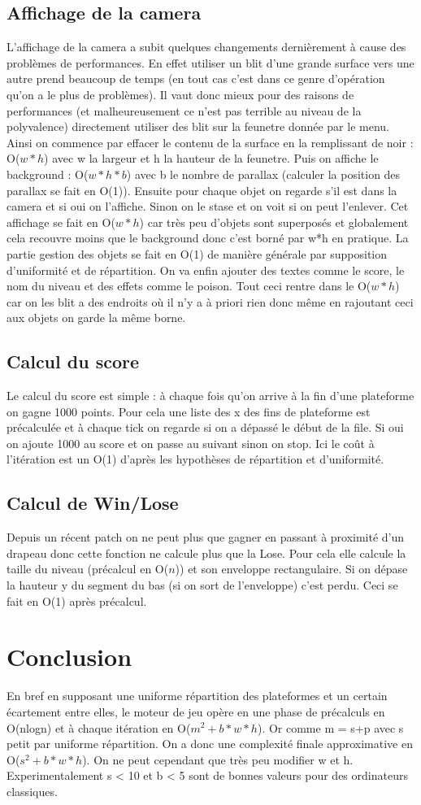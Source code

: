 \documentclass[11pt]{article}
\begin{document}
\subsection{Affichage de la camera}
L'affichage de la camera a subit quelques changements dernièrement à cause des problèmes de performances. En effet utiliser un blit d'une grande surface vers une autre prend beaucoup de temps (en tout cas c'est dans ce genre d'opération qu'on a le plus de problèmes). Il vaut donc mieux pour des raisons de performances (et malheureusement ce n'est pas terrible au niveau de la polyvalence) directement utiliser des blit sur la feunetre donnée par le menu. Ainsi on commence par effacer le contenu de la surface en la remplissant de noir : O($w*h$) avec w la largeur et h la hauteur de la feunetre. Puis on affiche le background : O($w*h*b$) avec b le nombre de parallax (calculer la position des parallax se fait en O(1)). Ensuite pour chaque objet on regarde s'il est dans la camera et si oui on l'affiche. Sinon on le stase et on voit si on peut l'enlever. Cet affichage se fait en O($w*h$) car très peu d'objets sont superposés et globalement cela recouvre moins que le background donc c'est borné par w*h en pratique. La partie gestion des objets se fait en O(1) de manière générale par supposition d'uniformité et de répartition. On va enfin ajouter des textes comme le score, le nom du niveau et des effets comme le poison. Tout ceci rentre dans le O($w*h$) car on les blit a des endroits où il n'y a à priori rien donc même en rajoutant ceci aux objets on garde la même borne.
\subsection{Calcul du score}
Le calcul du score est simple : à chaque fois qu'on arrive à la fin d'une plateforme on gagne 1000 points. Pour cela une liste des x des fins de plateforme est précalculée et à chaque tick on regarde si on a dépassé le début de la file. Si oui on ajoute 1000 au score et on passe au suivant sinon on stop. Ici le coût à l'itération est un O(1) d'après les hypothèses de répartition et d'uniformité.
\subsection{Calcul de Win/Lose}
Depuis un récent patch on ne peut plus que gagner en passant à proximité d'un drapeau donc cette fonction ne calcule plus que la Lose. Pour cela elle calcule la taille du niveau (précalcul en O($n$)) et son enveloppe rectangulaire. Si on dépase la hauteur y du segment du bas (si on sort de l'enveloppe) c'est perdu. Ceci se fait en O(1) après précalcul.
\section{Conclusion}
En bref en supposant une uniforme répartition des plateformes et un certain écartement entre elles, le moteur de jeu opère en une phase de précalculs en O(nlogn) et à chaque itération en O($m^2+b*w*h$). Or comme m = s+p avec s petit par uniforme répartition. On a donc une complexité finale approximative en O($s^2+b*w*h$). On ne peut cependant que très peu modifier w et h. Experimentalement s < 10 et b < 5 sont de bonnes valeurs pour des ordinateurs classiques.
\end{document}
